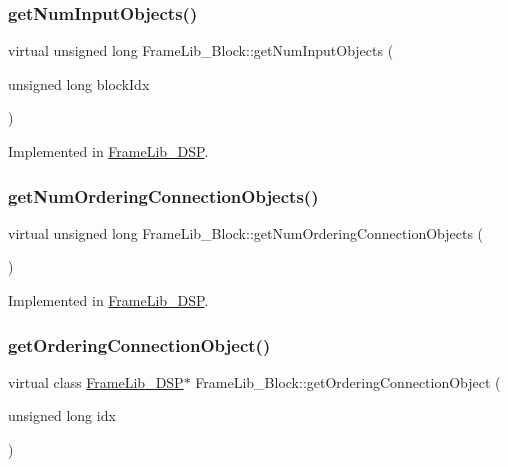 \subsubsection{\texorpdfstring{get\+Num\+Input\+Objects()}{getNumInputObjects()}}
{\footnotesize\ttfamily virtual unsigned long Frame\+Lib\+\_\+\+Block\+::get\+Num\+Input\+Objects (\begin{DoxyParamCaption}\item[{unsigned long}]{block\+Idx }\end{DoxyParamCaption})\hspace{0.3cm}{\ttfamily [pure virtual]}}



Implemented in \hyperlink{class_frame_lib___d_s_p_a3864d31866672734f27c80d6eff15d47}{Frame\+Lib\+\_\+\+D\+SP}.

\mbox{\label{class_frame_lib___block_a4a3be26fea03fcea53ef482cda07de56}} 
\subsubsection{\texorpdfstring{get\+Num\+Ordering\+Connection\+Objects()}{getNumOrderingConnectionObjects()}}
{\footnotesize\ttfamily virtual unsigned long Frame\+Lib\+\_\+\+Block\+::get\+Num\+Ordering\+Connection\+Objects (\begin{DoxyParamCaption}{ }\end{DoxyParamCaption})\hspace{0.3cm}{\ttfamily [pure virtual]}}



Implemented in \hyperlink{class_frame_lib___d_s_p_a5a36587f32b2f7a49e0737934dc8a59b}{Frame\+Lib\+\_\+\+D\+SP}.

\mbox{\label{class_frame_lib___block_a783373d2348b0d96b1c731041ba4fb0f}} 
\subsubsection{\texorpdfstring{get\+Ordering\+Connection\+Object()}{getOrderingConnectionObject()}}
{\footnotesize\ttfamily virtual class \hyperlink{class_frame_lib___d_s_p}{Frame\+Lib\+\_\+\+D\+SP}$\ast$ Frame\+Lib\+\_\+\+Block\+::get\+Ordering\+Connection\+Object (\begin{DoxyParamCaption}\item[{unsigned long}]{idx }\end{DoxyParamCaption})\hspace{0.3cm}{\ttfamily [pure virtual]}}



